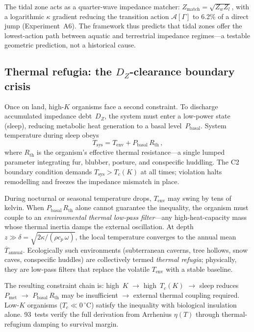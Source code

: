 \documentclass[aps,pre,twocolumn,superscriptaddress,floatfix]{revtex4-2}
\begin{document}
The tidal zone acts as a quarter-wave impedance matcher:
$Z_{\mathrm{match}} = \sqrt{Z_w Z_l}$, with a logarithmic
$\kappa$ gradient reducing the transition action
$\mathcal{A}[\Gamma]$ to 6.2\% of a direct jump
(Experiment~A6).
The framework thus predicts that tidal zones offer the
lowest-action path between aquatic and terrestrial
impedance regimes---a testable geometric prediction,
not a historical cause.

\subsection{Thermal refugia: the $D_Z$-clearance
  boundary crisis}
\label{sec:thermal-refugia}

Once on land, high-$K$ organisms face a second constraint.
To discharge accumulated impedance debt~$D_Z$, the system
must enter a low-power state (sleep), reducing metabolic
heat generation to a basal level~$P_{\text{basal}}$.
System temperature during sleep obeys
\begin{equation}
  T_{\text{sys}}
  = T_{\text{env}}
  + P_{\text{basal}}\,R_{\text{th}}\,,
  \label{eq:T-sleep-P3}
\end{equation}
where $R_{\text{th}}$ is the organism's effective thermal
resistance---a single lumped parameter integrating fur,
blubber, posture, and conspecific huddling.
The C2 boundary condition demands
$T_{\text{sys}} > T_c(K)$ at all times;
violation halts remodelling and freezes the impedance
mismatch in place.

During nocturnal or seasonal temperature drops,
$T_{\text{env}}$ may swing by tens of kelvin.
When $P_{\text{basal}}\,R_{\text{th}}$ alone cannot
guarantee the inequality, the organism must couple to
an \emph{environmental thermal low-pass filter}---any
high-heat-capacity mass whose thermal inertia damps
the external oscillation.
At depth~$z \gg \delta =
\sqrt{2\kappa/(\rho c_p\,\omega)}$, the local
temperature converges to the annual
mean~$\overline{T}_{\text{annual}}$.
Ecologically such environments (subterranean caverns,
tree hollows, snow caves, conspecific huddles) are
collectively termed \emph{thermal refugia}; physically,
they are low-pass filters that replace the volatile
$T_{\text{env}}$ with a stable baseline.

The resulting constraint chain is:
high~$K$ $\to$ high~$T_c(K)$ $\to$
sleep reduces $P_{\text{met}}$ $\to$
$P_{\text{basal}}\,R_{\text{th}}$ may be insufficient
$\to$ external thermal coupling required.
Low-$K$ organisms ($T_c \ll 0\,^\circ$C) satisfy the
inequality with biological insulation alone.
93~tests verify the full derivation from Arrhenius
$\eta(T)$ through thermal-refugium damping to
survival margin.
\end{document}

